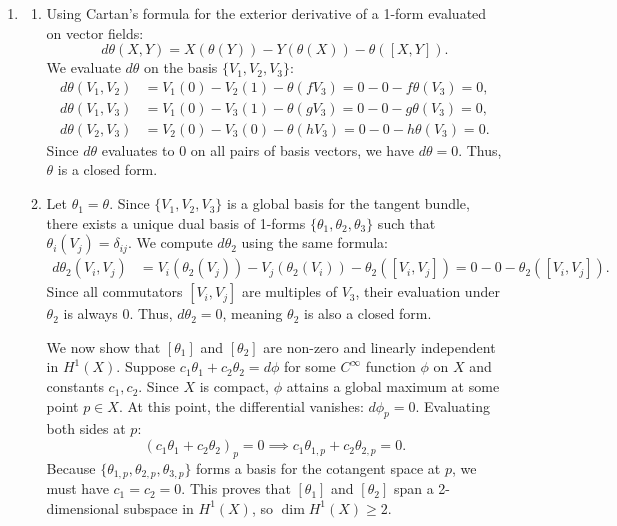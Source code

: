 \documentclass{article}
\begin{document}
\begin{enumerate}[label=\fbox{\arabic*}]
  \item %
        \begin{enumerate}[label=(\arabic*)]
          \item Using Cartan's formula for the exterior derivative of a 1-form evaluated on vector fields:
          \[
            d\theta(X, Y) = X(\theta(Y)) - Y(\theta(X)) - \theta([X, Y]).
          \]
          We evaluate $d\theta$ on the basis $\{V_1, V_2, V_3\}$:
          \begin{align*}
            d\theta(V_1, V_2) &= V_1(0) - V_2(1) - \theta(fV_3) = 0 - 0 - f\theta(V_3) = 0, \\
            d\theta(V_1, V_3) &= V_1(0) - V_3(1) - \theta(gV_3) = 0 - 0 - g\theta(V_3) = 0, \\
            d\theta(V_2, V_3) &= V_2(0) - V_3(0) - \theta(hV_3) = 0 - 0 - h\theta(V_3) = 0.
          \end{align*}
          Since $d\theta$ evaluates to 0 on all pairs of basis vectors, we have $d\theta = 0$. Thus, $\theta$ is a closed form.

          \item Let $\theta_1 = \theta$. Since $\{V_1, V_2, V_3\}$ is a global basis for the tangent bundle, there exists a unique dual basis of 1-forms $\{\theta_1, \theta_2, \theta_3\}$ such that $\theta_i(V_j) = \delta_{ij}$.
          We compute $d\theta_2$ using the same formula:
          \begin{align*}
            d\theta_2(V_i, V_j) &= V_i(\theta_2(V_j)) - V_j(\theta_2(V_i)) - \theta_2([V_i, V_j]) = 0 - 0 - \theta_2([V_i, V_j]).
          \end{align*}
          Since all commutators $[V_i, V_j]$ are multiples of $V_3$, their evaluation under $\theta_2$ is always 0.
          Thus, $d\theta_2 = 0$, meaning $\theta_2$ is also a closed form.
          
          We now show that $[\theta_1]$ and $[\theta_2]$ are non-zero and linearly independent in $H^1(X)$. 
          Suppose $c_1 \theta_1 + c_2 \theta_2 = d\phi$ for some $C^\infty$ function $\phi$ on $X$ and constants $c_1, c_2$.
          Since $X$ is compact, $\phi$ attains a global maximum at some point $p \in X$.
          At this point, the differential vanishes: $d\phi_p = 0$.
          Evaluating both sides at $p$:
          \[
            (c_1 \theta_1 + c_2 \theta_2)_p = 0 \implies c_1 \theta_{1,p} + c_2 \theta_{2,p} = 0.
          \]
          Because $\{\theta_{1,p}, \theta_{2,p}, \theta_{3,p}\}$ forms a basis for the cotangent space at $p$, we must have $c_1 = c_2 = 0$.
          This proves that $[\theta_1]$ and $[\theta_2]$ span a 2-dimensional subspace in $H^1(X)$, so $\dim H^1(X) \ge 2$.


\end{enumerate}
\end{enumerate}
\end{document}
